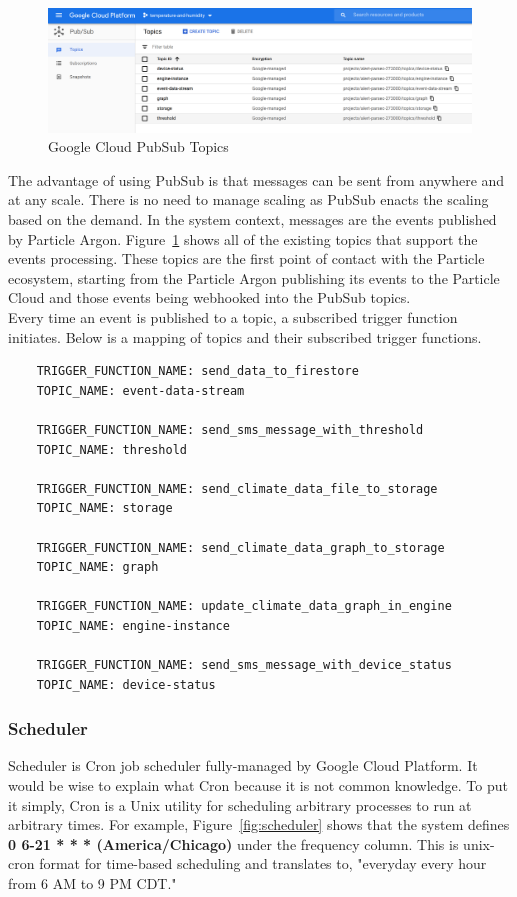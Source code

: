 \documentclass{article}
\begin{document}
\begin{figure}[H]
    \center
    \includegraphics[width=\textwidth]{images/pubsub-topics.png}
    \caption{Google Cloud PubSub Topics}
    \label{fig:pubsub-topics}
\end{figure}

The advantage of using PubSub is that messages can be sent from anywhere and at any scale. There is no need to manage scaling as PubSub enacts the scaling based on the demand. In the system context, messages are the events published by Particle Argon. Figure~\ref{fig:pubsub-topics} shows all of the existing topics that support the events processing. These topics are the first point of contact with the Particle ecosystem, starting from the Particle Argon publishing its events to the Particle Cloud and those events being webhooked into the PubSub topics.\\

Every time an event is published to a topic, a subscribed trigger function initiates. Below is a mapping of topics and their subscribed trigger functions.\\

\begin{lstlisting}
    TRIGGER_FUNCTION_NAME: send_data_to_firestore
    TOPIC_NAME: event-data-stream

    TRIGGER_FUNCTION_NAME: send_sms_message_with_threshold
    TOPIC_NAME: threshold

    TRIGGER_FUNCTION_NAME: send_climate_data_file_to_storage
    TOPIC_NAME: storage

    TRIGGER_FUNCTION_NAME: send_climate_data_graph_to_storage
    TOPIC_NAME: graph

    TRIGGER_FUNCTION_NAME: update_climate_data_graph_in_engine
    TOPIC_NAME: engine-instance

    TRIGGER_FUNCTION_NAME: send_sms_message_with_device_status
    TOPIC_NAME: device-status
\end{lstlisting}

\subsubsection{Scheduler}
Scheduler is Cron job scheduler fully-managed by Google Cloud Platform. It would be wise to explain what Cron because it is not common knowledge. To put it simply, Cron is a Unix utility for scheduling arbitrary processes to run at arbitrary times. For example, Figure~\ref{fig:scheduler} shows that the system defines \textbf{0 6-21 * * * (America/Chicago)} under the frequency column. This is unix-cron format for time-based scheduling and translates to, "everyday every hour from 6 AM to 9 PM CDT."
\end{document}
